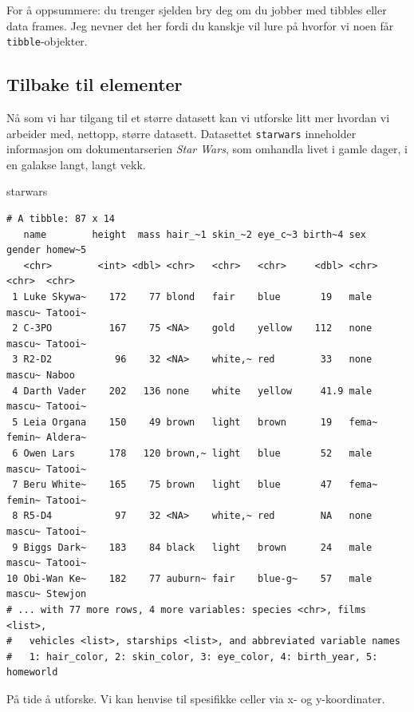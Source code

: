 \documentclass[
  letterpaper,
  DIV=11,
  numbers=noendperiod]{scrartcl}
\newenvironment{Shaded}{\begin{snugshade}}{\end{snugshade}}
\newcommand{\NormalTok}[1]{\textcolor[rgb]{0.00,0.23,0.31}{#1}}
\begin{document}
For å oppsummere: du trenger sjelden bry deg om du jobber med tibbles
eller data frames. Jeg nevner det her fordi du kanskje vil lure på
hvorfor vi noen får \texttt{tibble}-objekter.

\hypertarget{tilbake-til-elementer}{%
\subsection{Tilbake til elementer}\label{tilbake-til-elementer}}

Nå som vi har tilgang til et større datasett kan vi utforske litt mer
hvordan vi arbeider med, nettopp, større datasett. Datasettet
\texttt{starwars} inneholder informasjon om dokumentarserien \emph{Star
Wars}, som omhandla livet i gamle dager, i en galakse langt, langt vekk.

\begin{Shaded}
\begin{Highlighting}[]
\NormalTok{starwars}
\end{Highlighting}
\end{Shaded}

\begin{verbatim}
# A tibble: 87 x 14
   name        height  mass hair_~1 skin_~2 eye_c~3 birth~4 sex   gender homew~5
   <chr>        <int> <dbl> <chr>   <chr>   <chr>     <dbl> <chr> <chr>  <chr>  
 1 Luke Skywa~    172    77 blond   fair    blue       19   male  mascu~ Tatooi~
 2 C-3PO          167    75 <NA>    gold    yellow    112   none  mascu~ Tatooi~
 3 R2-D2           96    32 <NA>    white,~ red        33   none  mascu~ Naboo  
 4 Darth Vader    202   136 none    white   yellow     41.9 male  mascu~ Tatooi~
 5 Leia Organa    150    49 brown   light   brown      19   fema~ femin~ Aldera~
 6 Owen Lars      178   120 brown,~ light   blue       52   male  mascu~ Tatooi~
 7 Beru White~    165    75 brown   light   blue       47   fema~ femin~ Tatooi~
 8 R5-D4           97    32 <NA>    white,~ red        NA   none  mascu~ Tatooi~
 9 Biggs Dark~    183    84 black   light   brown      24   male  mascu~ Tatooi~
10 Obi-Wan Ke~    182    77 auburn~ fair    blue-g~    57   male  mascu~ Stewjon
# ... with 77 more rows, 4 more variables: species <chr>, films <list>,
#   vehicles <list>, starships <list>, and abbreviated variable names
#   1: hair_color, 2: skin_color, 3: eye_color, 4: birth_year, 5: homeworld
\end{verbatim}

På tide å utforske. Vi kan henvise til spesifikke celler via x- og
y-koordinater.
\end{document}
